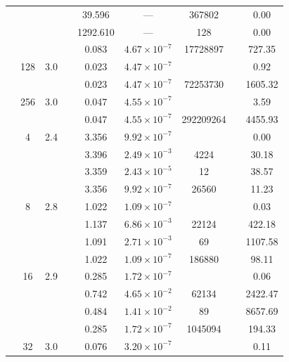\begin{table}[htbp]
\begin{tabular}{l S[table-format=3.0] S[table-format=4.1] l S[table-format=3.3] S[table-format=1.2e2] S[table-format=6.0] S[table-format=2.0] S[table-format=4.2]}
     &  &  &  & 39.596 & ${\text{---}}$ & 367802 & {\text{---}} & 0.00 \\
     &  &  &  & 1292.610 & ${\text{---}}$ & 128 & {\text{---}} & 0.00 \\
     &  &  &  & 0.083 & $4.67 \times 10^{-7}$ & 17728897 & {\text{---}} & 727.35 \\
     & 128 & 3.0 &  & 0.023 & $4.47 \times 10^{-7}$ & {\text{---}} & {\text{---}} & 0.92 \\
     &  &  &  & 0.023 & $4.47 \times 10^{-7}$ & 72253730 & {\text{---}} & 1605.32 \\
     & 256 & 3.0 &  & 0.047 & $4.55 \times 10^{-7}$ & {\text{---}} & {\text{---}} & 3.59 \\
     &  &  &  & 0.047 & $4.55 \times 10^{-7}$ & 292209264 & {\text{---}} & 4455.93 \\
    \midrule
     & 4 & 2.4 &  & 3.356 & $9.92 \times 10^{-7}$ & {\text{---}} & {\text{---}} & 0.00 \\
     &  &  &  & 3.396 & $2.49 \times 10^{-3}$ & 4224 & {\text{---}} & 30.18 \\
     &  &  &  & 3.359 & $2.43 \times 10^{-5}$ & 12 & {\text{---}} & 38.57 \\
     &  &  &  & 3.356 & $9.92 \times 10^{-7}$ & 26560 & {\text{---}} & 11.23 \\
     & 8 & 2.8 &  & 1.022 & $1.09 \times 10^{-7}$ & {\text{---}} & {\text{---}} & 0.03 \\
     &  &  &  & 1.137 & $6.86 \times 10^{-3}$ & 22124 & {\text{---}} & 422.18 \\
     &  &  &  & 1.091 & $2.71 \times 10^{-3}$ & 69 & {\text{---}} & 1107.58 \\
     &  &  &  & 1.022 & $1.09 \times 10^{-7}$ & 186880 & {\text{---}} & 98.11 \\
     & 16 & 2.9 &  & 0.285 & $1.72 \times 10^{-7}$ & {\text{---}} & {\text{---}} & 0.06 \\
     &  &  &  & 0.742 & $4.65 \times 10^{-2}$ & 62134 & {\text{---}} & 2422.47 \\
     &  &  &  & 0.484 & $1.41 \times 10^{-2}$ & 89 & {\text{---}} & 8657.69 \\
     &  &  &  & 0.285 & $1.72 \times 10^{-7}$ & 1045094 & {\text{---}} & 194.33 \\
     & 32 & 3.0 &  & 0.076 & $3.20 \times 10^{-7}$ & {\text{---}} & {\text{---}} & 0.11 \\

\end{tabular}
\end{table}
